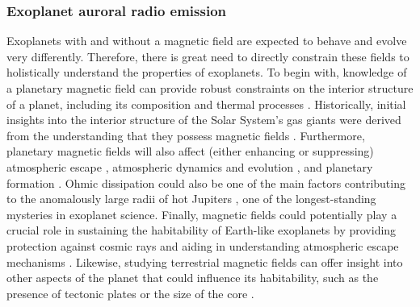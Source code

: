 \subsubsection{Exoplanet auroral radio emission} 
Exoplanets with and without a magnetic field are expected to behave and evolve very differently. Therefore, there is great need to directly constrain these fields to holistically understand the properties of exoplanets. To begin with, knowledge of a planetary magnetic field can provide robust constraints on the interior structure of a planet, including its composition and thermal processes \citep{G2015,Brain2024}. Historically, initial insights into the interior structure of the Solar System's gas giants were derived from the understanding that they possess magnetic fields \citep{Hubbard1973}. Furthermore, planetary magnetic fields will also affect (either enhancing or suppressing) atmospheric escape \citep{G2015,Zarka2018haex,Lazio2019,Egan2019,Brain2024}, atmospheric dynamics and evolution \citep{Perna2010a,Beltz2023}, and planetary formation \citep{Lovelace2008,Batygin2018,Jia2023}. Ohmic dissipation could also be one of the main factors contributing to the anomalously large radii of hot Jupiters \citep{Perna2010a,Batygin2010,Thorngren2018}, one of the longest-standing mysteries in exoplanet science. Finally, magnetic fields could potentially play a crucial role in sustaining the habitability of Earth-like exoplanets by providing protection against cosmic rays \citep{Gr2015,exss2018,Shahar2019} and aiding in understanding atmospheric escape mechanisms \citep{Lazio2019,Zarka2018haex,Kopparapu2020}. Likewise, studying terrestrial magnetic fields can offer insight into other aspects of the planet that could influence its habitability, such as the presence of tectonic plates or the size of the core \citep{Shahar2019,Kopparapu2020}.

